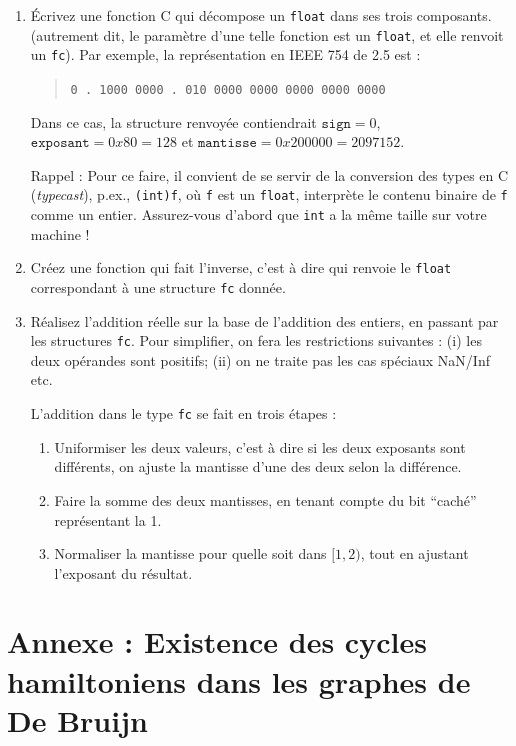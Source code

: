 \documentclass[11pt]{article}
\begin{document}
\begin{enumerate}
\item Écrivez une fonction C qui d\'ecompose un \verb+float+
  dans ses trois composants. (autrement dit, le paramètre d'une telle
  fonction est un \texttt{float}, et elle renvoit un \verb+fc+).
  Par exemple, la représentation en IEEE 754 de 2.5 est :
\begin{quote}
\verb+0 . 1000 0000 . 010 0000 0000 0000 0000 0000+
\end{quote}
Dans ce cas, la structure renvoyée contiendrait $\mathtt{sign}=0$,
$\mathtt{exposant}=0x80=128$ et $\mathtt{mantisse}=0x200000=2097152$.

Rappel : Pour ce faire, il convient de se servir de la conversion des
types en C (\emph{typecast}), p.ex., \texttt{(int)f}, où \texttt{f}
est un \texttt{float}, interprète le contenu binaire de \texttt{f} comme
un entier. Assurez-vous d'abord que \texttt{int} a la même taille
sur votre machine !

\item Créez une fonction qui fait l'inverse, c'est à dire qui renvoie
  le \texttt{float} correspondant à une structure \verb+fc+ donn\'ee.

\item Réalisez l'addition réelle sur la base de l'addition des entiers,
  en passant par les structures \verb+fc+. Pour simplifier, on fera les
  restrictions suivantes : (i) les deux opérandes sont positifs;
  (ii) on ne traite pas les cas spéciaux NaN/Inf etc.

L'addition dans le type \verb+fc+ se fait en trois étapes :
\begin{enumerate}
\item Uniformiser les deux valeurs, c'est à dire si les deux exposants sont
  différents, on ajuste la mantisse d'une des deux selon la
  différence.
\item Faire la somme des deux mantisses, en tenant compte du bit ``caché''
  représentant la 1.
\item Normaliser la mantisse pour quelle soit dans $[1,2)$, tout en ajustant
  l'exposant du résultat.
\end{enumerate}

\end{enumerate}




\appendix

\section*{Annexe : Existence des cycles hamiltoniens dans les graphes de De Bruijn}
\end{document}
